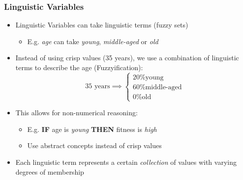 \documentclass[
	10pt,
	t		%
]{beamer}
\begin{document}
\begin{frame}
	\frametitle{Linguistic Variables}
	\begin{itemize}
		\item Linguistic Variables can take linguistic terms (fuzzy sets)
		      \begin{itemize}
			      \item E.g. \textit{age} can take \textit{young}, \textit{middle-aged} or \textit{old}
		      \end{itemize}
		\item Instead of using crisp values (35 years), we use a combination of linguistic terms to describe the age (Fuzzyification):
		      \[ \text{ 35 years} \implies  \begin{cases}
				      \text{20\% young}       \\
				      \text{60\% middle-aged} \\
				      \text{0\% old}
			      \end{cases}
		      \]
		\item This allows for non-numerical reasoning:
		      \begin{itemize}
			      \item E.g. \textbf{IF} age is \textit{young} \textbf{THEN} fitness is \textit{high}
			      \item Use abstract concepts instead of crisp values
		      \end{itemize}
		\item Each linguistic term represents a certain \textit{collection} of values with varying degrees of membership
	\end{itemize}
\end{frame}
\end{document}
